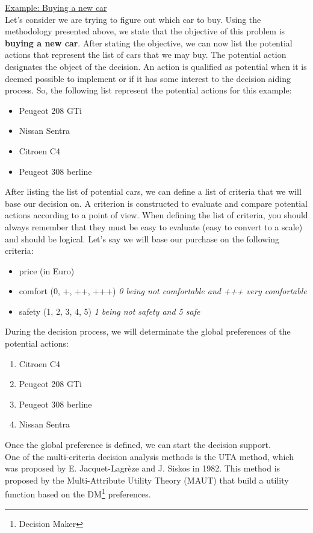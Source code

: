 \documentclass{report}
\begin{document}
\underline{Example: Buying a new car} \\
Let's consider we are trying to figure out which car to buy. Using the methodology presented above, we state that the objective of this problem is \textbf{buying a new car}. After stating the objective, we can now list the potential actions that represent the list of cars that we may buy. The potential action designates the object of the decision. An action is qualified as potential when it is deemed possible to implement or if it has some interest to the decision aiding process. So, the following list represent the potential actions for this example: 
\begin{itemize}
\item Peugeot 208 GTi
\item Nissan Sentra
\item Citroen C4
\item Peugeot 308 berline
\end{itemize}
After listing the list of potential cars, we can define a list of criteria that we will base our decision on. A criterion is constructed to evaluate and compare potential actions according to a point of view. When defining the list of criteria, you should always remember that they must be easy to evaluate (easy to convert to a scale) and should be logical.
Let's say we will base our purchase on the following criteria:
\begin{itemize}
\item price (in Euro)
\item comfort (0, +, ++, +++) \textit{0 being not comfortable and +++ very comfortable}
\item safety (1, 2, 3, 4, 5) \textit{1 being not safety and 5 safe}
\end{itemize}
\newpage
During the decision process, we will determinate the global preferences of the potential actions:
\begin{enumerate}
\item Citroen C4
\item Peugeot 208 GTi
\item Peugeot 308 berline
\item Nissan Sentra
\end{enumerate}
Once the global preference is defined, we can start the decision support.\\

One of the multi-criteria decision analysis methods is the UTA method, which was proposed by E. Jacquet-Lagrèze and J. Siskos in 1982. This method is proposed by the Multi-Attribute Utility Theory (MAUT) that build a utility function based on the DM\footnote{Decision Maker} preferences.\\ 
\end{document}
